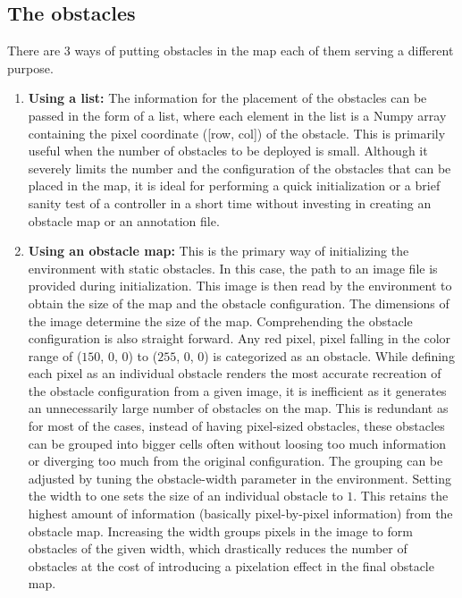 \subsection{The obstacles}
There are 3 ways of putting obstacles in the map each of them serving a different purpose.
\begin{enumerate}
\item \textbf{Using a list:}
The information for the placement of the obstacles can be passed in the form of a list, where each element in the list is a Numpy array containing the pixel coordinate ([row, col]) of the obstacle. This is primarily useful when the number of obstacles to be deployed is small. Although it severely limits the number and the configuration of the obstacles that can be placed in the map, it is ideal for performing a quick initialization or a brief sanity test of a controller in a short time without investing in creating an obstacle map or an annotation file.
\item \textbf{Using an obstacle map:}
This is the primary way of initializing the environment with static obstacles. In this case, the path to an image file is provided during initialization. This image is then read by the environment to obtain the size of the map and the obstacle configuration. 
The dimensions of the image determine the size of the map. Comprehending the obstacle configuration is also straight forward. Any red pixel, pixel falling in the color range of ($150$, $0$, $0$) to ($255$, $0$, $0$) is categorized as an obstacle. While defining each pixel as an individual obstacle renders the most accurate recreation of the obstacle configuration from a given image, it is inefficient as it generates an unnecessarily large number of obstacles on the map.
This is redundant as for most of the cases, instead of having pixel-sized obstacles,  these obstacles can be grouped into bigger cells often without loosing too much information or diverging too much from the original configuration. The grouping can be adjusted by tuning the obstacle-width parameter in the environment.  Setting the width to one sets the size of an individual obstacle to $1$. This retains the highest amount of information (basically pixel-by-pixel information) from the obstacle map. Increasing the width groups pixels in the image to form obstacles of the given width, which drastically reduces the number of obstacles at the cost of introducing a pixelation effect in the final obstacle map.


\end{enumerate}
